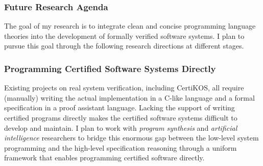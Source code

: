 \documentclass[a4paper, 10pt]{article}
\begin{document}
\begin{small}
\begin{comment}
A promising step
toward conquering this challenge is to  verify  the
end-to-end information-flow
security of the whole system formally. 
This step can be naturally established
using our CertiKOS framework~\cite{pldi16-security}. In CertiKOS, we only need to prove the noninterference between user processes 
 at the top-most layer of the system, and the contextual property of deep specifications propagates
this security guarantee down to the level of the concrete implementation.
This security guarantee
can be seen as end-to-end in the following two aspects: (1)
it applies across all the layers, and (2) it ensures that the entire
execution is secure from start to finish.
\end{comment}

\subsubsection*{\large Future Research Agenda}
The goal of my research is to
integrate clean and concise programming language theories
into the development of formally verified software systems.
I plan to pursue this goal through the following research directions at different stages.


\subsubsection*{\small Programming Certified Software Systems Directly}
Existing  projects on real system verification,
including CertiKOS, all require   (manually)  writing the actual implementation
 in a C-like language and a formal specification in a proof assistant language.
Lacking the support of  writing certified  programs  directly makes the certified  software systems difficult to develop and maintain. I plan to work with \emph{program synthesis} 
and \emph{artificial intelligence} researchers to bridge this enormous gap between the low-level system programming and the high-level specification reasoning
through
a uniform framework that enables programming certified software directly.


\end{small}
\end{document}

